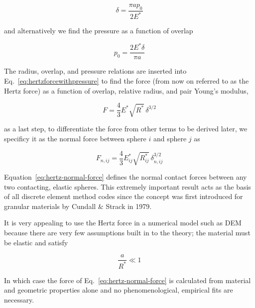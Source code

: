 \begin{equation}
	\delta = \frac{\pi a p_0}{2E^*}
\end{equation}

and alternatively we find the pressure as a function of overlap

\begin{equation}
	p_0 = \frac{2E^*\delta}{\pi a}
\end{equation}

The radius, overlap, and pressure relations are inserted into Eq.~\ref{eq:hertzforcewithpressure} to find the force (from now on referred to as the Hertz force) as a function of overlap, relative radius, and pair Young's modulus,

\begin{equation}\label{eq:hertz-force}
	F = \frac{4}{3}E^* \sqrt{R^*} \, \delta^{3/2}
\end{equation}

as a last step, to differentiate the force from other terms to be derived later, we specificy it as the normal force between sphere $i$ and sphere $j$ as

\begin{equation}\label{eq:hertz-normal-force}
	F_{n,ij} = \frac{4}{3}E_{ij}^* \sqrt{R_{ij}^*} \, \delta_{n,ij}^{3/2}
\end{equation}

Equation~\ref{eq:hertz-normal-force} defines the normal contact forces between any two contacting, elastic spheres. This extremely important result acts as the basis of all discrete element method codes since the concept was first introduced for granular materials by Cundall \& Strack in 1979\cite{Cundall1979}. 

It is very appealing to use the Hertz force in a numerical model such as DEM because there are very few assumptions built in to the theory; the material must be elastic and satisfy

\begin{equation}
	\frac{a}{R^*} \ll 1
\end{equation}

In which case the force of Eq.~\ref{eq:hertz-normal-force} is calculated from material and geometric properties alone and no phenomenological, empirical fits are necessary.



